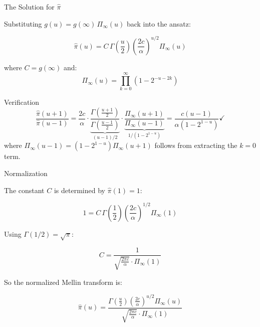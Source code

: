 \documentclass[aspectratio=169]{beamer}
\begin{document}
\begin{frame}{The Solution for $\hat{\pi}$}

  Substituting $g(u) = g(\infty)\,\Pi_\infty(u)$ back into
  the ansatz:

  \[
    \hat{\pi}(u) = C\,\Gamma\!\left(\frac{u}{2}\right)
    \left(\frac{2c}{\alpha}\right)^{u/2}\Pi_\infty(u)
  \]

  where $C = g(\infty)$ and:
  \[
    \Pi_\infty(u) = \prod_{k=0}^\infty\left(1-2^{-u-2k}\right)
  \]

  \pause
  \begin{block}{Verification}
    \[
      \frac{\hat{\pi}(u+1)}{\hat{\pi}(u-1)}
      = \frac{2c}{\alpha}\cdot
        \underbrace{\frac{\Gamma\!\left(\frac{u+1}{2}\right)}
                        {\Gamma\!\left(\frac{u-1}{2}\right)}}_{(u-1)/2}
      \cdot
      \underbrace{\frac{\Pi_\infty(u+1)}{\Pi_\infty(u-1)}}_{1/(1-2^{1-u})}
      = \frac{c(u-1)}{\alpha(1-2^{1-u})} \checkmark
    \]
    where $\Pi_\infty(u-1) = (1-2^{1-u})\Pi_\infty(u+1)$
    follows from extracting the $k=0$ term.
  \end{block}

\end{frame}

\begin{frame}{Normalization}

  The constant $C$ is determined by $\hat{\pi}(1) = 1$:

  \[
    1 = C\,\Gamma\!\left(\frac{1}{2}\right)
    \left(\frac{2c}{\alpha}\right)^{1/2}\Pi_\infty(1)
  \]

  Using $\Gamma(1/2) = \sqrt{\pi}$:

  \[
    \boxed{
      C = \frac{1}{\sqrt{\frac{2\pi c}{\alpha}}\cdot\Pi_\infty(1)}
    }
  \]

  \bigskip
  So the normalized Mellin transform is:

  \[
    \hat{\pi}(u) =
    \frac{\Gamma\!\left(\frac{u}{2}\right)
          \left(\frac{2c}{\alpha}\right)^{u/2}
          \Pi_\infty(u)}
         {\sqrt{\frac{2\pi c}{\alpha}}\cdot\Pi_\infty(1)}
  \]

\end{frame}
\end{document}
